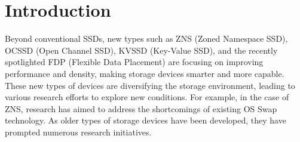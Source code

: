 \section{Introduction} %
\label{s:intro}





Beyond conventional SSDs, new types such as ZNS (Zoned Namespace SSD), OCSSD (Open Channel SSD), KVSSD (Key-Value SSD), and the recently spotlighted FDP (Flexible Data Placement) are focusing on improving performance and density, making storage devices smarter and more capable.
These new types of devices are diversifying the storage environment, leading to various research efforts to explore new conditions.
For example, in the case of ZNS, research has aimed to address the shortcomings of existing OS Swap technology.
As older types of storage devices have been developed, they have prompted numerous research initiatives.

